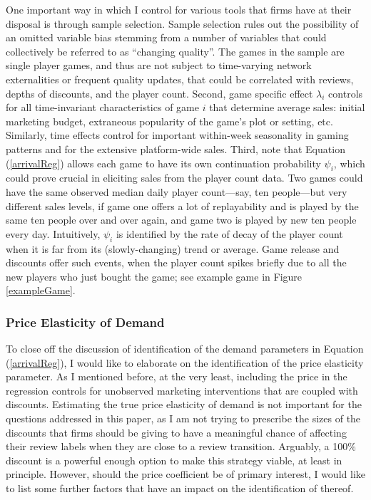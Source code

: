 \documentclass[
  12pt,
  pagebackref]{article}
\begin{document}
One important way in which I control for various tools that firms have
at their disposal is through sample selection. Sample selection rules
out the possibility of an omitted variable bias stemming from a number
of variables that could collectively be referred to as ``changing
quality''. The games in the sample are single player games, and thus are
not subject to time-varying network externalities or frequent quality
updates, that could be correlated with reviews, depths of discounts, and
the player count. Second, game specific effect \(\lambda_i\) controls
for all time-invariant characteristics of game \(i\) that determine
average sales: initial marketing budget, extraneous popularity of the
game's plot or setting, etc. Similarly, time effects control for
important within-week seasonality in gaming patterns and for the
extensive platform-wide sales. Third, note that Equation
(\ref{arrivalReg}) allows each game to have its own continuation
probability \(\psi_i\), which could prove crucial in eliciting sales
from the player count data. Two games could have the same observed
median daily player count---say, ten people---but very different sales
levels, if game one offers a lot of replayability and is played by the
same ten people over and over again, and game two is played by new ten
people every day. Intuitively, \(\psi_i\) is identified by the rate of
decay of the player count when it is far from its (slowly-changing)
trend or average. Game release and discounts offer such events, when the
player count spikes briefly due to all the new players who just bought
the game; see example game in Figure \ref{exampleGame}.

\hypertarget{price-elasticity-of-demand}{%
\subsubsection{Price Elasticity of
Demand}\label{price-elasticity-of-demand}}

To close off the discussion of identification of the demand parameters
in Equation (\ref{arrivalReg}), I would like to elaborate on the
identification of the price elasticity parameter. As I mentioned before,
at the very least, including the price in the regression controls for
unobserved marketing interventions that are coupled with discounts.
Estimating the true price elasticity of demand is not important for the
questions addressed in this paper, as I am not trying to prescribe the
sizes of the discounts that firms should be giving to have a meaningful
chance of affecting their review labels when they are close to a review
transition. Arguably, a 100\% discount is a powerful enough option to
make this strategy viable, at least in principle. However, should the
price coefficient be of primary interest, I would like to list some
further factors that have an impact on the identification of thereof.
\end{document}
